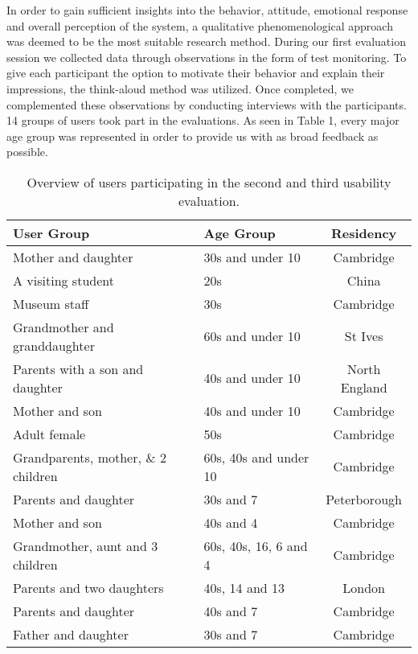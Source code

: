 \documentclass[prodmode,acmtomm]{acmsmall}
\begin{document}
In order to gain sufficient insights into the behavior, attitude, emotional response and overall perception of the system, a qualitative phenomenological approach \cite{creswell2013} was deemed to be the most suitable research method. During our first evaluation session we collected data through observations in the form of test monitoring. To give each participant the option to motivate their behavior and explain their impressions, the think-aloud method \cite{tullis2008} was utilized. Once completed, we complemented these observations by conducting interviews with the participants. 
\\

14 groups of users took part in the evaluations. As seen in  Table 1, every major age group was represented in order to provide us with as broad feedback as possible. 


\begin{table}[h]
\setlength\extrarowheight{2pt}
\begin{tabular}{  | p{6.0cm} | p{4.0cm}  | c |}
\hline 
User Group & Age Group & Residency \\ \hline 

Mother and daughter & 30s and under 10 & Cambridge \\
A visiting student & 20s & China\\
Museum staff & 30s & Cambridge \\
Grandmother and granddaughter & 60s and under 10 & St Ives \\
Parents with a son and daughter & 40s and under 10 & North England \\
Mother and son & 40s and under 10 & Cambridge \\
Adult female & 50s & Cambridge \\
Grandparents, mother, \& 2 children & 60s, 40s and under 10 & Cambridge\\
Parents and daughter & 30s and 7 & Peterborough\\
Mother and son &  40s and 4 & Cambridge\\
Grandmother, aunt and 3 children & 60s, 40s, 16, 6 and 4 & Cambridge \\
Parents and two daughters & 40s, 14 and 13 & London\\
Parents and daughter & 40s and 7& Cambridge \\
Father and daughter & 30s and 7 & Cambridge \\ \hline


\end{tabular}
\label{users_participating}
\caption{Overview of users participating in the second and third usability evaluation.}

\end{table}
\end{document}
